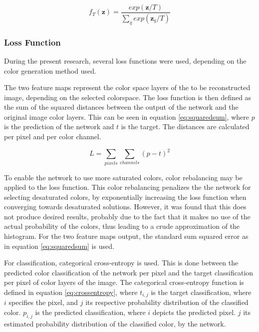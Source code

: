 \begin{equation}
f_{T}(\textbf{z})=\frac{exp(\textbf{z}/T)}{\sum_q^{}exp(\textbf{z}_{q}/T)}
\label{eq:anmean}
\end{equation}




\subsubsection{Loss Function}
During the present research, several loss functions were used, depending on the color generation method used.

The two feature maps represent the color space layers of the to be reconstructed image, depending on the selected colorspace. The loss function is then defined as the sum of the squared distances between the output of the network and the original image color layers. This can be seen in equation \ref{eq:squaredsum}, where $p$ is the prediction of the network and $t$ is the target. The distances are calculated per pixel and per color channel.

\begin{equation}
\label{eq:squaredsum}
L = \sum_{pixels} \sum_{channels}(p - t)^2
\end{equation}

To enable the network to use more saturated colors, color rebalancing may be applied to the loss function. This color rebalancing penalizes the the network for selecting desaturated colors, by exponentially increasing the loss function when converging towards desaturated solutions. However, it was found that this does not produce desired results, probably due to the fact that it makes no use of the actual probability of the colors, thus leading to a crude approximation of the histogram. For the two feature maps output, the standard sum squared error as in equation \ref{eq:squaredsum} is used.

For classification, categorical cross-entropy is used. This is done between the predicted color classification of the network per pixel and the target classification per pixel of color layers of the image. The categorical cross-entropy function is defined in equation \ref{eq:crossentropy}, where $t_{i,j}$ is the target classification, where $i$ specifies the pixel, and $j$ its respective probability distribution of the classified color. 
$p_{i,j}$ is the predicted classification, where $i$ depicts the predicted pixel. $j$ its estimated probability distribution of the classified color, by the network.

